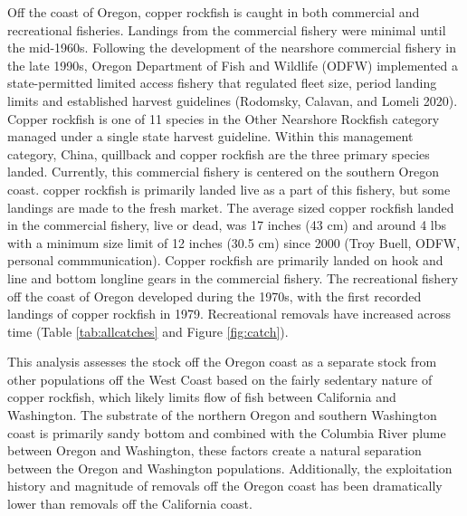 \documentclass[11pt,
  english,
  a4paper,
]{article}
\begin{document}

Off the coast of Oregon, copper rockfish is caught in both commercial and recreational fisheries. Landings from the commercial fishery were minimal until the mid-1960s. Following the development of the nearshore commercial fishery in the late 1990s, Oregon Department of Fish and Wildlife (ODFW) implemented a state-permitted limited access fishery that regulated fleet size, period landing limits and established harvest guidelines {(Rodomsky, Calavan, and Lomeli 2020)\leavevmode\tagmcend\tagstructend}. Copper rockfish is one of 11 species in the Other Nearshore Rockfish category managed under a single state harvest guideline. Within this management category, China, quillback and copper rockfish are the three primary species landed. Currently, this commercial fishery is centered on the southern Oregon coast. copper rockfish is primarily landed live as a part of this fishery, but some landings are made to the fresh market. The average sized copper rockfish landed in the commercial fishery, live or dead, was 17 inches (43 cm) and around 4 lbs with a minimum size limit of 12 inches (30.5 cm) since 2000 (Troy Buell, ODFW, personal commmunication). Copper rockfish are primarily landed on hook and line and bottom longline gears in the commercial fishery. The recreational fishery off the coast of Oregon developed during the 1970s, with the first recorded landings of copper rockfish in 1979. Recreational removals have increased across time (Table \ref{tab:allcatches} and Figure \ref{fig:catch}).

\leavevmode\tagmcend\tagstructend\par


This analysis assesses the stock off the Oregon coast as a separate stock from other populations off the West Coast based on the fairly sedentary nature of copper rockfish, which likely limits flow of fish between California and Washington. The substrate of the northern Oregon and southern Washington coast is primarily sandy bottom and combined with the Columbia River plume between Oregon and Washington, these factors create a natural separation between the Oregon and Washington populations. Additionally, the exploitation history and magnitude of removals off the Oregon coast has been dramatically lower than removals off the California coast.

\leavevmode\tagmcend\tagstructend\par
\end{document}
